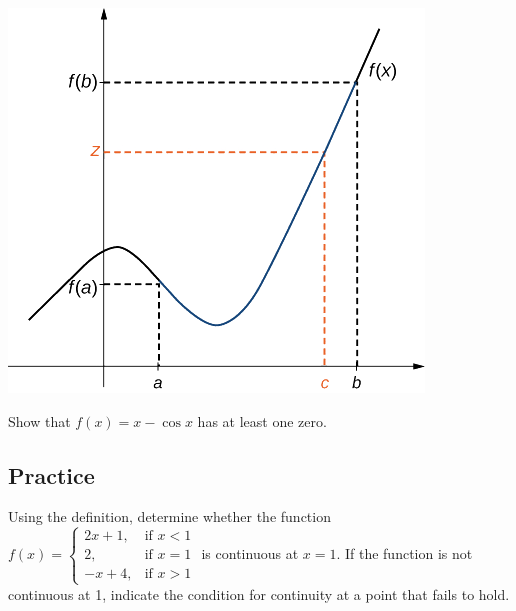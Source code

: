 \includegraphics{img/2.4.3.png}

\begin{example}

Show that \(f(x)=x-\cos x\) has at least one zero.

\end{example}
\vspace*{6\baselineskip}

\subsection{Practice}





\begin{exercise}

  Using the definition, determine whether the function
  \(f(x)=\begin{cases}2x+1, & \text{if }x<1\\2, & \text{if }x=1\\ -x+4, & \text{if }x>1\end{cases}\)
  is continuous at \(x=1\). If the function is not continuous at 1,
  indicate the condition for continuity at a point that fails to hold.
  
  \end{exercise}
  \vspace*{6\baselineskip}
  
